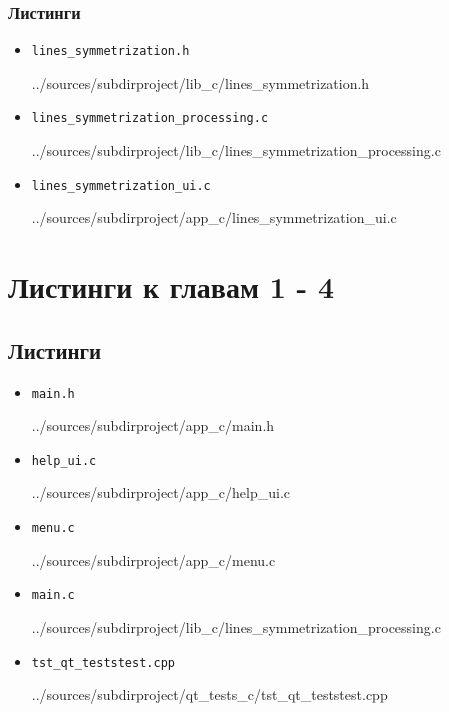 \documentclass[12pt,a4paper]{report}
\begin{document}
\subsection*{Листинги}
\begin{itemize}
\item[] \verb-lines_symmetrization.h-

{../sources/subdirproject/lib_c/lines_symmetrization.h}
\item[] \verb-lines_symmetrization_processing.c-

{../sources/subdirproject/lib_c/lines_symmetrization_processing.c}
\item[] \verb-lines_symmetrization_ui.c-

{../sources/subdirproject/app_c/lines_symmetrization_ui.c}
\end{itemize}
%

\chapter{Листинги к главам 1 - 4}

\section{Листинги}
\begin{itemize}
\item[] \verb-main.h-

{../sources/subdirproject/app_c/main.h}

\item[] \verb-help_ui.c-

{../sources/subdirproject/app_c/help_ui.c}

\item[] \verb-menu.c-

{../sources/subdirproject/app_c/menu.c}

\item[] \verb-main.c-

{../sources/subdirproject/lib_c/lines_symmetrization_processing.c}

\item[] \verb-tst_qt_teststest.cpp-

{../sources/subdirproject/qt_tests_c/tst_qt_teststest.cpp}
\end{itemize}
%
\end{document}
